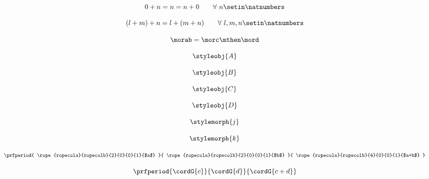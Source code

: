 \begin{forslides}
    \begin{equation}
        \label{eq:semicats-slides-44}
        0 + n = n = n + 0   \quad \quad \forall \ n \setin \natnumbers
    \end{equation}

    \begin{equation}
        \label{eq:semicats-slides-45}
        (l + m) + n = l + (m + n) \quad \quad  \forall \ l, m, n \setin \natnumbers
    \end{equation}

    \begin{equation}
        \label{eq:semicats-slides-46}
        \morab = \morc \mthen \mord
    \end{equation}

    \begin{equation}
        \label{eq:semicats-slides-47}
        \styleobj{A}
    \end{equation}

    \begin{equation}
        \label{eq:semicats-slides-48}
        \styleobj{B}
    \end{equation}

    \begin{equation}
        \label{eq:4semicats-slides-9}
        \styleobj{C}
    \end{equation}

    \begin{equation}
        \label{eq:semicats-slides-50}
        \styleobj{D}
    \end{equation}

    \begin{equation}
        \label{eq:semicats-slides-51}
        \stylemorph{j}
    \end{equation}

    \begin{equation}
        \label{eq:semicats-slides-52}
        \stylemorph{k}
    \end{equation}

    \begin{equation}
        \label{eq:semicats-slides-53}
        \prfperiod{
            \rope{ropecola}{ropecolb}{2}{0}{0}{1}{$a$}
        }{
            \rope{ropecola}{ropecolb}{2}{0}{0}{1}{$b$}
        }{
            \rope{ropecola}{ropecolb}{4}{0}{0}{1}{$a+b$}
        }
    \end{equation}

    \begin{equation}
        \label{eq:semicats-slides-54}
        \prfperiod{
            \cordG{c}
        }{
            \cordG{d}
        }{
            \cordG{c+d}
        }
    \end{equation}


\end{forslides}
